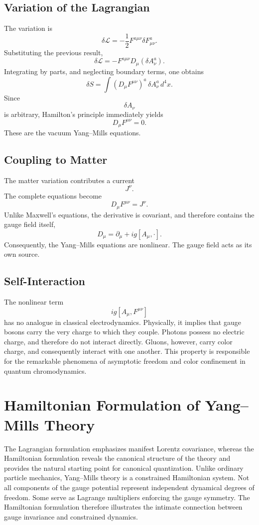 \subsection{Variation of the Lagrangian}
The variation is
\[\delta\mathcal L=-\frac12F^{a\mu\nu}\delta F_{\mu\nu}^a.\]
Substituting the previous result,
\[\delta\mathcal L=-F^{a\mu\nu}D_\mu(\delta A_\nu^a).\]
Integrating by parts,
and neglecting boundary terms,
one obtains
\[\delta S=\int(D_\mu F^{\mu\nu})^a\,\delta A_\nu^a\,d^4x.\]
Since
\[\delta A_\nu\]
is arbitrary,
Hamilton's principle immediately yields
\[\boxed{D_\mu F^{\mu\nu}=0.}\]
These are the vacuum Yang--Mills equations.
\subsection{Coupling to Matter}
The matter variation contributes a current
\[J^\nu.\]
The complete equations become
\[\boxed{D_\mu F^{\mu\nu}=J^\nu.}\]
Unlike Maxwell's equations,
the derivative is covariant,
and therefore contains the gauge field itself,
\[D_\mu=\partial_\mu+ig[A_\mu,\cdot].\]
Consequently,
the Yang--Mills equations are nonlinear.
The gauge field acts as its own source.
\subsection{Self-Interaction}
The nonlinear term
\[ig[A_\mu,F^{\mu\nu}]\]
has no analogue in classical electrodynamics.
Physically,
it implies that gauge bosons carry the very charge to which they couple.
Photons possess no electric charge,
and therefore do not interact directly.
Gluons,
however,
carry color charge,
and consequently interact with one another.
This property is responsible for the remarkable phenomena of asymptotic
freedom and color confinement in quantum chromodynamics.
\section{Hamiltonian Formulation of Yang--Mills Theory}
The Lagrangian formulation emphasizes manifest Lorentz covariance,
whereas the Hamiltonian formulation reveals the canonical structure of
the theory and provides the natural starting point for canonical
quantization.
Unlike ordinary particle mechanics, Yang--Mills theory is a constrained
Hamiltonian system. Not all components of the gauge potential represent
independent dynamical degrees of freedom. Some serve as Lagrange
multipliers enforcing the gauge symmetry.
The Hamiltonian formulation therefore illustrates the intimate
connection between gauge invariance and constrained dynamics.
